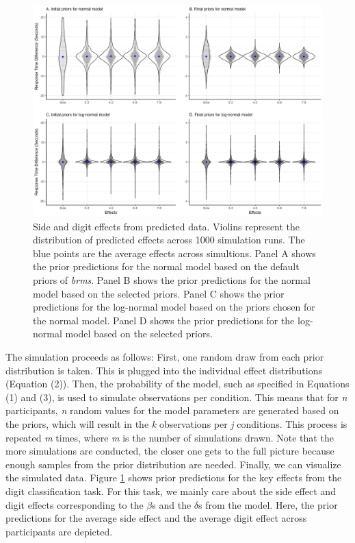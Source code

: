 \documentclass[
  english,
  doc,floatsintext]{apa6}
\begin{document}
\begin{figure}[H]

\includegraphics[width=1\linewidth]{I - Images/Fig5_priorpredfigure_v2} \hfill{}

\caption{Side and digit effects from predicted data. Violins represent the distribution of predicted effects across 1000 simulation runs. The blue points are the average effects across simultions. Panel A shows the prior predictions for the normal model based on the default priors of \textit{brms}. Panel B shows the prior predictions for the normal model based on the selected priors. Panel C shows the prior predictions for the log-normal model based on the priors chosen for the normal model. Panel D shows the prior predictions for the log-normal model based on the selected priors.}\label{fig:priorpredfigurepanel}
\end{figure}

The simulation proceeds as follows: First, one random draw from each prior distribution is taken. This is plugged into the individual effect distributions (Equation (2)). Then, the probability of the model, such as specified in Equations (1) and (3), is used to simulate observations per condition. This means that for \emph{n} participants, \emph{n} random values for the model parameters are generated based on the priors, which will result in the \emph{k} observations per \emph{j} conditions. This process is repeated \emph{m} times, where \emph{m} is the number of simulations drawn. Note that the more simulations are conducted, the closer one gets to the full picture because enough samples from the prior distribution are needed. Finally, we can visualize the simulated data. Figure \ref{fig:priorpredfigurepanel} shows prior predictions for the key effects from the digit classification task. For this task, we mainly care about the side effect and digit effects corresponding to the \(\beta\)s and the \(\delta\)s from the model. Here, the prior predictions for the average side effect and the average digit effect across participants are depicted.
\end{document}
